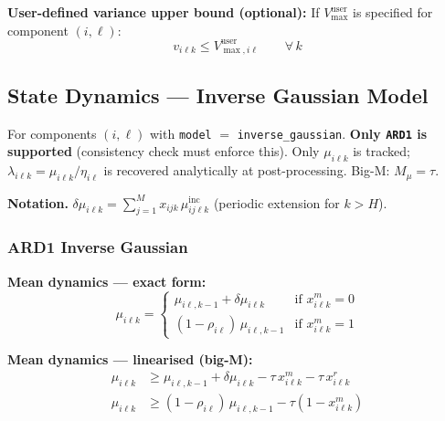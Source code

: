 \documentclass[11pt,a4paper]{article}
\begin{document}
\textbf{User-defined variance upper bound (optional):}
If $V_{\max}^{\mathrm{user}}$ is specified for component $(i,\ell)$:
\begin{equation}
  v_{i\ell k} \leq V_{\max,i\ell}^{\mathrm{user}} \qquad \forall\, k
\end{equation}

\subsection{State Dynamics --- Inverse Gaussian Model}
\label{sec:dyn_ig}

For components $(i,\ell)$ with \texttt{model} $=$ \texttt{inverse\_gaussian}.
\textbf{Only \texttt{ARD1} is supported} (consistency check must enforce this).
Only $\mu_{i\ell k}$ is tracked; $\lambda_{i\ell k} = \mu_{i\ell k}/\eta_{i\ell}$
is recovered analytically at post-processing. Big-M: $M_\mu = \tau$.

\textbf{Notation.} $\delta\mu_{i\ell k} = \sum_{j=1}^{M} x_{ijk}\,\mu^{\mathrm{inc}}_{ij\ell k}$
(periodic extension for $k > H$).

\subsubsection{ARD1 Inverse Gaussian}

\textbf{Mean dynamics --- exact form:}
\begin{equation}
  \mu_{i\ell k} = \begin{cases}
    \mu_{i\ell,k-1} + \delta\mu_{i\ell k} & \text{if } x^m_{i\ell k} = 0 \\
    (1-\rho_{i\ell})\,\mu_{i\ell,k-1} & \text{if } x^m_{i\ell k} = 1
  \end{cases}
\end{equation}

\textbf{Mean dynamics --- linearised (big-M):}
\begin{align}
  \mu_{i\ell k} &\geq \mu_{i\ell,k-1} + \delta\mu_{i\ell k} - \tau\,x^m_{i\ell k}
    - \tau\,x^r_{i\ell k}
    \label{eq:ig_mu1} \\
  \mu_{i\ell k} &\geq (1-\rho_{i\ell})\,\mu_{i\ell,k-1} - \tau(1-x^m_{i\ell k})
    \label{eq:ig_mu2}
\end{align}
\end{document}
